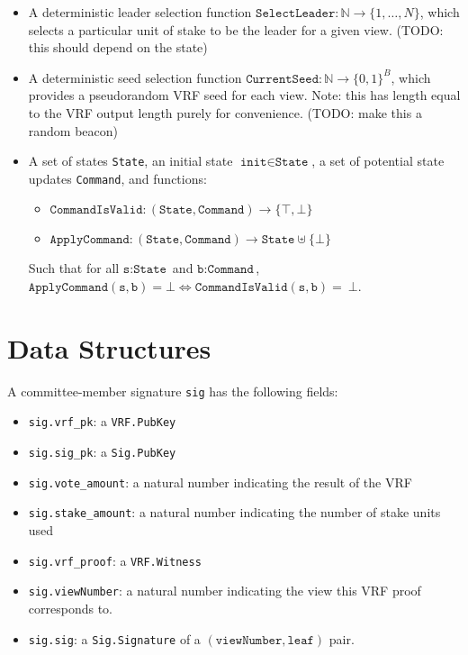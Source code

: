 \documentclass[11pt, oneside]{article}       %
\begin{document}
\begin{itemize}
\item A deterministic leader selection function \(\texttt{SelectLeader}:
    \mathbb{N} \to \{1,\ldots,N\}\), which selects a particular unit of stake to
    be the leader for a given view.
    (TODO: this should depend on the state) %

\item A deterministic seed selection function \(\texttt{CurrentSeed}:
    \mathbb{N} \to {\{0,1\}}^B\), which provides a pseudorandom VRF
    seed for each view. Note: this has length equal to the VRF output
    length purely for convenience. (TODO: make this a random
    beacon)

\item A set of states \texttt{State}, an initial state \(\texttt{init} \in
    \texttt{State}\), a set of potential state updates \texttt{Command}, and
    functions:

    \begin{itemize}
        \item \(\texttt{CommandIsValid} : (\texttt{State},\texttt{Command}) \to
            \{\top,\bot\}\)

        \item \(\texttt{ApplyCommand} : (\texttt{State},\texttt{Command}) \to
            \texttt{State} \uplus \{\bot\}\)
    \end{itemize}

    Such that for all \(\texttt{s}: \texttt{State}\) and \(\texttt{b}:
    \texttt{Command}\), \(\texttt{ApplyCommand}(\texttt{s},\texttt{b}) = \bot
    \iff \texttt{CommandIsValid}(\texttt{s},\texttt{b}) =~\bot\).

\end{itemize}

\section{Data Structures}

A committee-member signature \texttt{sig} has the following fields:

\begin{itemize}
    \item \texttt{sig.vrf\_pk}: a \texttt{VRF.PubKey}
    \item \texttt{sig.sig\_pk}: a \texttt{Sig.PubKey}
    \item \texttt{sig.vote\_amount}: a natural number indicating the result
        of the VRF
    \item \texttt{sig.stake\_amount}: a natural number indicating the
        number of stake units used
    \item \texttt{sig.vrf\_proof}: a \texttt{VRF.Witness}
    \item \texttt{sig.viewNumber}: a natural number indicating the view
        this VRF proof corresponds to.
    \item \texttt{sig.sig}: a \texttt{Sig.Signature} of a
        \((\texttt{viewNumber},\texttt{leaf})\) pair.
\end{itemize}
\end{document}
